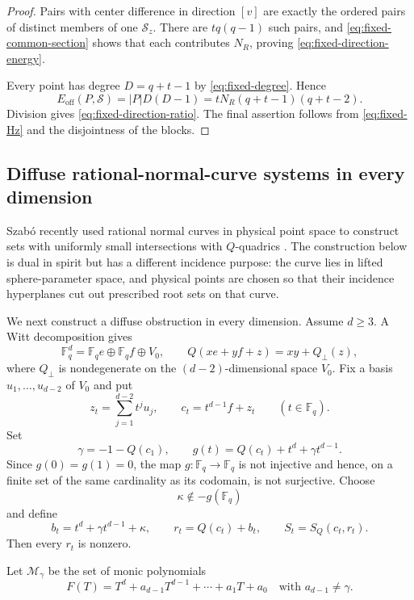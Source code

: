 \documentclass[11pt,letterpaper]{amsart}
\theoremstyle{definition}
\theoremstyle{remark}
\newcommand{\1}{\mathbf 1}
\begin{document}
\begin{proof}
Pairs with center difference in direction $[v]$ are exactly the ordered pairs of distinct members of one $\mathcal S_z$.  There are $tq(q-1)$ such pairs, and \eqref{eq:fixed-common-section} shows that each contributes $N_R$, proving \eqref{eq:fixed-direction-energy}.

Every point has degree $D=q+t-1$ by \eqref{eq:fixed-degree}.  Hence
\[
 E_{\mathrm{off}}(P,\mathcal S)
 =|P|D(D-1)
 =tN_R(q+t-1)(q+t-2).
\]
Division gives \eqref{eq:fixed-direction-ratio}.  The final assertion follows from \eqref{eq:fixed-Hz} and the disjointness of the blocks.
\end{proof}



\subsection{Diffuse rational-normal-curve systems in every dimension}\label{subsec:rnc}

Szab\'o recently used rational normal curves in physical point space to construct sets with uniformly small intersections with $Q$-quadrics \cite{Szabo}.  The construction below is dual in spirit but has a different incidence purpose: the curve lies in lifted sphere-parameter space, and physical points are chosen so that their incidence hyperplanes cut out prescribed root sets on that curve.

We next construct a diffuse obstruction in every dimension.  Assume $d\ge3$.  A Witt decomposition gives
\[
 \mathbb F_q^d=\mathbb F_q e\oplus\mathbb F_q f\oplus V_0,
 \qquad
 Q(xe+yf+z)=xy+Q_\perp(z),
\]
where $Q_\perp$ is nondegenerate on the $(d-2)$-dimensional space $V_0$.  Fix a basis $u_1,\ldots,u_{d-2}$ of $V_0$ and put
\[
 z_t=\sum_{j=1}^{d-2}t^j u_j,
 \qquad
 c_t=t^{d-1}f+z_t
 \qquad(t\in\mathbb F_q).
\]
Set
\[
 \gamma=-1-Q(c_1),
 \qquad
 g(t)=Q(c_t)+t^d+\gamma t^{d-1}.
\]
Since $g(0)=g(1)=0$, the map $g:\mathbb F_q\to\mathbb F_q$ is not injective and hence, on a finite set of the same cardinality as its codomain, is not surjective.  Choose
\[
 \kappa\notin-g(\mathbb F_q)
\]
and define
\begin{equation}\label{eq:rnc-spheres}
 b_t=t^d+\gamma t^{d-1}+\kappa,
 \qquad
 r_t=Q(c_t)+b_t,
 \qquad
 S_t=S_Q(c_t,r_t).
\end{equation}
Then every $r_t$ is nonzero.

Let $\mathcal M_\gamma$ be the set of monic polynomials
\[
 F(T)=T^d+a_{d-1}T^{d-1}+\cdots+a_1T+a_0
 \quad\text{with }a_{d-1}\ne\gamma.
\]
\end{document}

